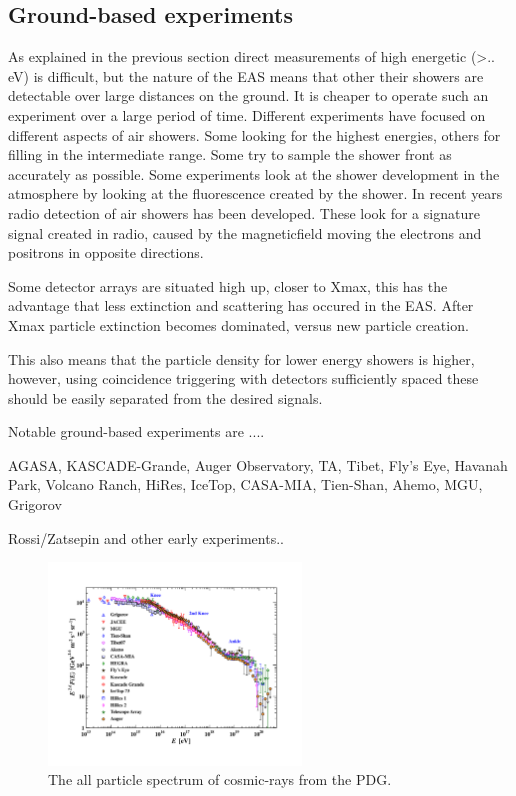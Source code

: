 \subsection{Ground-based experiments}

As explained in the previous section direct measurements of high energetic (>.. eV) is difficult, but the nature of the EAS means that other their showers are detectable over large distances on the ground. It is cheaper to operate such an experiment over a large period of time. Different experiments have focused on different aspects of air showers. Some looking for the highest energies, others for filling in the intermediate range. Some try to sample the shower front as accurately as possible. Some experiments look at the shower development in the atmosphere by looking at the fluorescence created by the shower. In recent years radio detection of air showers has been developed. These look for a signature signal created in radio, caused by the magneticfield moving the electrons and positrons in opposite directions.

Some detector arrays are situated high up, closer to Xmax, this has the advantage that less extinction and scattering has occured in the EAS. After Xmax particle extinction becomes dominated, versus new particle creation. 

This also means that the particle density for lower energy showers is higher, however, using coincidence triggering with detectors sufficiently spaced these should be easily separated from the desired signals.

Notable ground-based experiments are ....

AGASA, KASCADE-Grande, Auger Observatory, TA, Tibet, Fly's Eye, Havanah Park, Volcano Ranch, HiRes, IceTop, CASA-MIA, Tien-Shan, Ahemo, MGU, Grigorov

Rossi/Zatsepin and other early experiments..


\begin{figure}
    \centering
    \includegraphics[width=0.6\textwidth]
                    {plots/cosmic-rays/PDG_28_8_all_particle_spectrum}
    \caption{The all particle spectrum of cosmic-rays from the PDG.}
    \label{fig:spectrum}
\end{figure}



